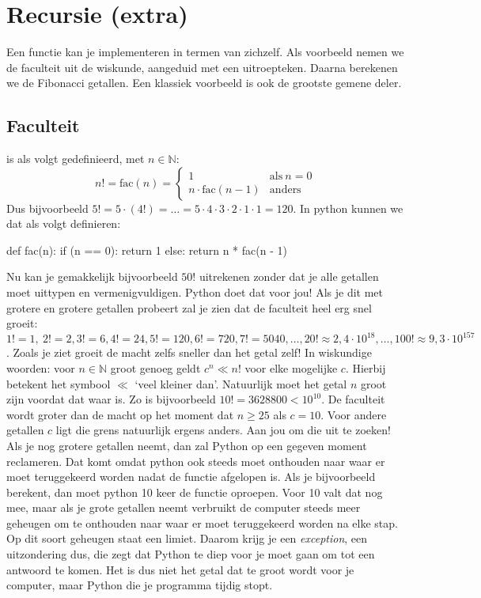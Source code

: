 \section{Recursie (extra)}
  Een functie kan je implementeren in termen van zichzelf. Als voorbeeld nemen
  we de faculteit uit de wiskunde, aangeduid met een uitroepteken. Daarna
  berekenen we de Fibonacci getallen. Een klassiek voorbeeld is ook de grootste
  gemene deler.
  \subsection{Faculteit} is als volgt gedefinieerd, met $n \in \mathbb{N}$:
  \begin{equation*}
    n! = \text{fac}\left(n\right) =
    \begin{cases}
      1                                & \text{als}\ n = 0 \\
      n\cdot\text{fac}\left(n-1\right) & \text{anders}
    \end{cases}
  \end{equation*}
  Dus bijvoorbeeld
  $5!=5\cdot(4!)= \ldots = 5\cdot4\cdot3\cdot2\cdot1\cdot1 = 120$. In python
  kunnen we dat als volgt definieren:
  \begin{python}
    def fac(n):
      if (n == 0): return 1
      else: return n * fac(n - 1)
  \end{python}
  Nu kan je gemakkelijk bijvoorbeeld $50!$ uitrekenen zonder dat je alle
  getallen moet uittypen en vermenigvuldigen. Python doet dat voor jou! Als je
  dit met grotere en grotere getallen probeert zal je zien dat de faculteit heel
  erg snel groeit: $1!=1,\ 2!=2, 3!=6, 4!=24, 5!=120, 6!=720, 7!=5040, \ldots, 20!
  \approx 2,4\cdot10^{18}, \ldots, 100! \approx 9,3\cdot10^{157}$. Zoals je ziet
  groeit de macht zelfs sneller dan het getal zelf! In wiskundige woorden:
  voor $n \in \mathbb{N}$ groot genoeg geldt $c^n\ll n!$ voor elke mogelijke
  $c$. Hierbij betekent het symbool $\ll$ `veel kleiner dan'. Natuurlijk moet
  het getal $n$ groot zijn voordat dat waar is. Zo is bijvoorbeeld $10! =
  3628800 < 10^{10}$. De faculteit wordt groter dan de macht op het moment dat
  $n \geq 25$ als $c = 10$. Voor andere getallen $c$ ligt die grens natuurlijk
  ergens anders. Aan jou om die uit te zoeken!
  \\[1em]
  Als je nog grotere getallen neemt, dan zal Python op een gegeven moment
  reclameren. Dat komt omdat python ook steeds moet onthouden naar waar er moet
  teruggekeerd worden nadat de functie afgelopen is. Als je bijvoorbeeld
   berekent, dan moet python 10 keer de functie  oproepen.
  Voor 10 valt dat nog mee, maar als je grote getallen neemt verbruikt de
  computer steeds meer geheugen om te onthouden naar waar er moet teruggekeerd
  worden na elke stap. Op dit soort geheugen staat een limiet. Daarom krijg je
  een \emph{exception}, een uitzondering dus, die zegt dat Python te diep voor
  je moet gaan om tot een antwoord te komen. Het is dus niet het getal dat te
  groot wordt voor je computer, maar Python die je programma tijdig stopt.

